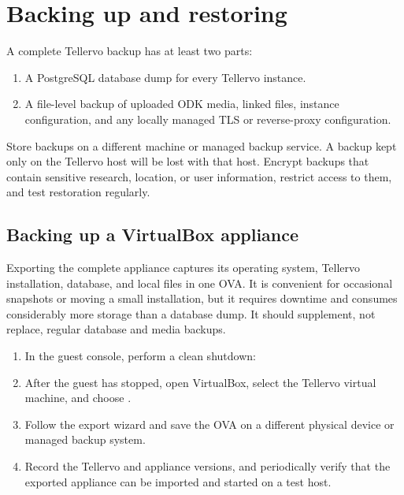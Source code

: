 \section{Backing up and restoring}

A complete Tellervo backup has at least two parts:

\begin{enumerate}
 \item A PostgreSQL database dump for every Tellervo instance.
 \item A file-level backup of uploaded ODK media, linked files, instance
 configuration, and any locally managed TLS or reverse-proxy configuration.
\end{enumerate}

Store backups on a different machine or managed backup service. A backup kept
only on the Tellervo host will be lost with that host. Encrypt backups that
contain sensitive research, location, or user information, restrict access to
them, and test restoration regularly.

\subsection{Backing up a VirtualBox appliance}
\label{txt:BackupVA}

Exporting the complete appliance captures its operating system, Tellervo
installation, database, and local files in one OVA. It is convenient for
occasional snapshots or moving a small installation, but it requires downtime
and consumes considerably more storage than a database dump. It should
supplement, not replace, regular database and media backups.

\begin{enumerate}
 \item In the guest console, perform a clean shutdown:


 \item After the guest has stopped, open VirtualBox, select the Tellervo virtual
 machine, and choose .
 \item Follow the export wizard and save the OVA on a different physical device
 or managed backup system.
 \item Record the Tellervo and appliance versions, and periodically verify that
 the exported appliance can be imported and started on a test host.
\end{enumerate}

